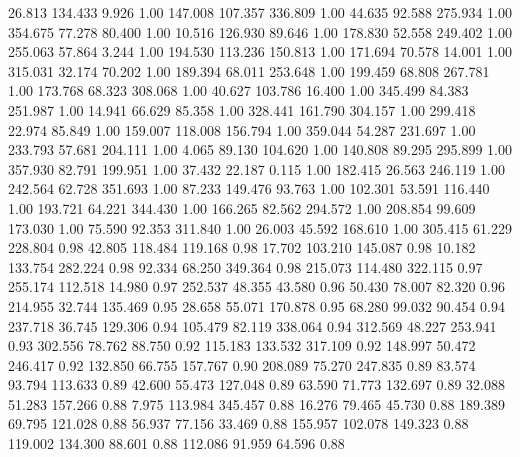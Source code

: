   26.813  134.433    9.926         1.00
 147.008  107.357  336.809         1.00
  44.635   92.588  275.934         1.00
 354.675   77.278   80.400         1.00
  10.516  126.930   89.646         1.00
 178.830   52.558  249.402         1.00
 255.063   57.864    3.244         1.00
 194.530  113.236  150.813         1.00
 171.694   70.578   14.001         1.00
 315.031   32.174   70.202         1.00
 189.394   68.011  253.648         1.00
 199.459   68.808  267.781         1.00
 173.768   68.323  308.068         1.00
  40.627  103.786   16.400         1.00
 345.499   84.383  251.987         1.00
  14.941   66.629   85.358         1.00
 328.441  161.790  304.157         1.00
 299.418   22.974   85.849         1.00
 159.007  118.008  156.794         1.00
 359.044   54.287  231.697         1.00
 233.793   57.681  204.111         1.00
   4.065   89.130  104.620         1.00
 140.808   89.295  295.899         1.00
 357.930   82.791  199.951         1.00
  37.432   22.187    0.115         1.00
 182.415   26.563  246.119         1.00
 242.564   62.728  351.693         1.00
  87.233  149.476   93.763         1.00
 102.301   53.591  116.440         1.00
 193.721   64.221  344.430         1.00
 166.265   82.562  294.572         1.00
 208.854   99.609  173.030         1.00
  75.590   92.353  311.840         1.00
  26.003   45.592  168.610         1.00
 305.415   61.229  228.804         0.98
  42.805  118.484  119.168         0.98
  17.702  103.210  145.087         0.98
  10.182  133.754  282.224         0.98
  92.334   68.250  349.364         0.98
 215.073  114.480  322.115         0.97
 255.174  112.518   14.980         0.97
 252.537   48.355   43.580         0.96
  50.430   78.007   82.320         0.96
 214.955   32.744  135.469         0.95
  28.658   55.071  170.878         0.95
  68.280   99.032   90.454         0.94
 237.718   36.745  129.306         0.94
 105.479   82.119  338.064         0.94
 312.569   48.227  253.941         0.93
 302.556   78.762   88.750         0.92
 115.183  133.532  317.109         0.92
 148.997   50.472  246.417         0.92
 132.850   66.755  157.767         0.90
 208.089   75.270  247.835         0.89
  83.574   93.794  113.633         0.89
  42.600   55.473  127.048         0.89
  63.590   71.773  132.697         0.89
  32.088   51.283  157.266         0.88
   7.975  113.984  345.457         0.88
  16.276   79.465   45.730         0.88
 189.389   69.795  121.028         0.88
  56.937   77.156   33.469         0.88
 155.957  102.078  149.323         0.88
 119.002  134.300   88.601         0.88
 112.086   91.959   64.596         0.88
